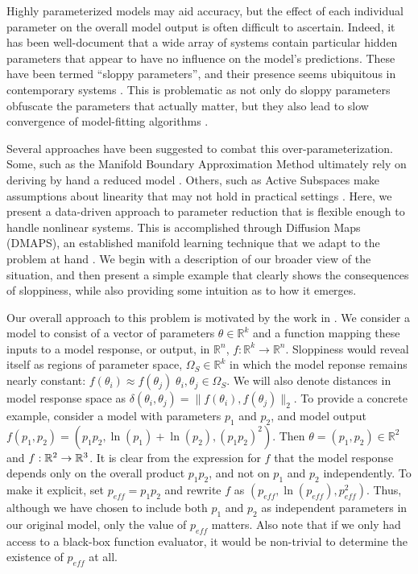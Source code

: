 Highly parameterized models may aid accuracy, but the effect of each
individual parameter on the overall model output is often difficult to
ascertain. Indeed, it has been well-document that a wide array of
systems contain particular hidden parameters that appear to have no
influence on the model's predictions. These have been termed ``sloppy
parameters'', and their presence seems ubiquitous in contemporary
systems \cite{Universally Sloppy Parameter Sensitivities in Systems
  Biology Models, Extracting Falsifiable Predictions from Sloppy
  Models}. This is problematic as not only do sloppy parameters
obfuscate the parameters that actually matter, but they also lead to
slow convergence of model-fitting algorithms \cite{Geometry of
  nonlinear least squares with applications to sloppy models and
  optimization}.

Several approaches have been suggested to combat this
over-parameterization. Some, such as the Manifold Boundary
Approximation Method ultimately rely on deriving by hand a reduced
model \cite{Model Reduction by Manifold Boundaries}. Others, such as
Active Subspaces make assumptions about linearity that may not hold in
practical settings \cite{Active Subspaces}. Here, we present a
data-driven approach to parameter reduction that is flexible enough to
handle nonlinear systems. This is accomplished through Diffusion Maps
(DMAPS), an established manifold learning technique that we adapt to
the problem at hand \cite{Diffusion Maps}. We begin with a description
of our broader view of the situation, and then present a simple
example that clearly shows the consequences of sloppiness, while also
providing some intuition as to how it emerges.

Our overall approach to this problem is motivated by the work in
\cite{Geometry of nonlinear least squares with applications to sloppy
  models and optimization}. We consider a model to consist of a vector
of parameters $\theta \in \mathbb{R}^k$ and a function mapping these
inputs to a model response, or output, in $\mathbb{R}^n$,
$f: \mathbb{R}^k \rightarrow \mathbb{R}^n$. Sloppiness would reveal
itself as regions of parameter space, $\Omega_S \in \mathbb{R}^k$ in
which the model reponse remains nearly constant:
$f(\theta_i) \approx f(\theta_j)\; \theta_i, \theta_j \in
\Omega_S$. We will also denote distances in model response space as
$\delta(\theta_i, \theta_j) = \| f(\theta_i), f(\theta_j)\|_2$. To
provide a concrete example, consider a model with parameters $p_1$ and
$p_2$, and model output
$f(p_1, p_2) = (p_1 p_2 , \ln(p_1) + \ln(p_2) , (p_1 p_2)^2)$. Then
$\theta = (p_1, p_2) \in \mathbb{R}^2$ and $f: \mathbb{R}^2 \rightarrow
\mathbb{R}^3$. It is clear from the expression for $f$ that the model response
depends only on the overall product $p_1 p_2$, and not on $p_1$ and
$p_2$ independently. To make it explicit, set $p_{eff} = p_1 p_2$ and
rewrite $f$ as $(p_{eff}, \ln(p_{eff}), p_{eff}^2)$. Thus, although we
have chosen to include both $p_1$ and $p_2$ as independent parameters
in our original model, only the value of $p_{eff}$ matters. Also note
that if we only had access to a black-box function evaluator, it would
be non-trivial to determine the existence of $p_{eff}$ at all.

